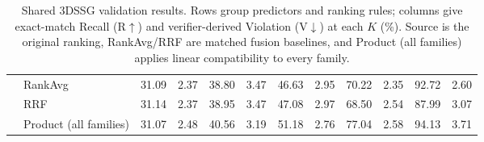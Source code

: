 \begin{table}[!t]
{\begin{tabular}{@{}llrrrrrrrrrr@{}}
& RankAvg & 31.09 & 2.37 & 38.80 & 3.47 & 46.63 & 2.95 & 70.22 & 2.35 & 92.72 & 2.60 \\
& RRF & 31.14 & 2.37 & 38.95 & 3.47 & 47.08 & 2.97 & 68.50 & 2.54 & 87.99 & 3.07 \\
& Product (all families) & 31.07 & 2.48 & 40.56 & 3.19 & 51.18 & 2.76 & 77.04 & 2.58 & 94.13 & 3.71 \\
\bottomrule
\end{tabular}
}
\caption{Shared 3DSSG validation results. Rows group predictors and ranking
rules; columns give exact-match Recall (R$\uparrow$) and verifier-derived
Violation (V$\downarrow$) at each $K$ (\%). Source is the original ranking,
RankAvg/RRF are matched fusion baselines, and Product (all families) applies
linear compatibility to every family.}
\label{tab:main-results}
\end{table}

